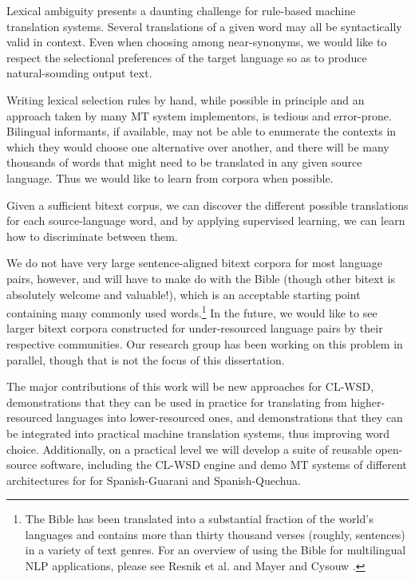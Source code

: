 Lexical ambiguity presents a daunting challenge for rule-based machine
translation systems. Several translations of a given word may all be
syntactically valid in context.
Even when choosing among near-synonyms, we would like to respect the
selectional preferences of the target language so as to produce
natural-sounding output text.

Writing lexical selection rules by hand, while possible in principle and an
approach taken by many MT system implementors, is tedious and error-prone.
Bilingual informants, if available, may not be able to enumerate the contexts
in which they would choose one alternative over another, and there will be many
thousands of words that might need to be translated in any given source
language. Thus we would like to learn from corpora when possible.

Given a sufficient bitext corpus, we can discover the different possible
translations for each source-language word, and by applying supervised
learning, we can learn how to discriminate between them.

We do not have very large sentence-aligned bitext corpora for most language
pairs, however, and will have to make do with the Bible (though other bitext is
absolutely welcome and valuable!), which is an acceptable
starting point containing many commonly used words.\footnote{The
Bible has been translated into a substantial fraction of the world's languages
and contains more than thirty thousand verses (roughly, sentences) in
a variety of text genres. For an overview of using the Bible for multilingual
NLP applications, please see Resnik et al.
\cite{DBLP:journals/lre/ResnikOD99} and Mayer and Cysouw
\cite{MAYER14.220.L14-1215}.} In the future, we would like to see larger
bitext corpora constructed for under-resourced language pairs by their
respective communities. Our research group has been working on this problem in
parallel, though that is not the focus of this dissertation.

The major contributions of this work will be new approaches for CL-WSD,
demonstrations that they can be used in practice for translating from
higher-resourced languages into lower-resourced ones, and demonstrations that
they can be integrated into practical machine translation systems, thus
improving word choice.
Additionally, on a practical level we will develop a suite of reusable 
open-source software, including the CL-WSD engine and demo MT systems of
different architectures for for Spanish-Guarani and Spanish-Quechua.

